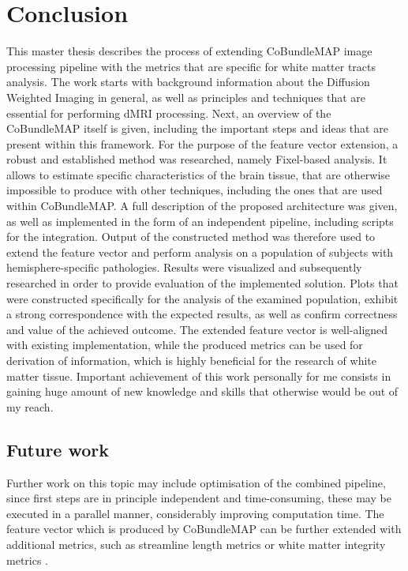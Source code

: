 \documentclass[thesis.tex]{subfiles}
\begin{document}
\chapter{Conclusion}
This master thesis describes the process of extending CoBundleMAP image processing pipeline with the metrics that are specific for white matter tracts analysis. The work starts with background information about the Diffusion Weighted Imaging in general, as well as principles and techniques that are essential for performing dMRI processing. Next, an overview of the CoBundleMAP itself is given, including the important steps and ideas that are present within this framework. For the purpose of the feature vector extension, a robust and established method was researched, namely Fixel-based analysis. It allows to estimate specific characteristics of the brain tissue, that are otherwise impossible to produce with other techniques, including the ones that are used within CoBundleMAP. A full description of the proposed architecture was given, as well as implemented in the form of an independent pipeline, including scripts for the integration. Output of the constructed method was therefore used to extend the feature vector and perform analysis on a population of subjects with hemisphere-specific pathologies. Results were visualized and subsequently researched in order to provide evaluation of the implemented solution. Plots that were constructed specifically for the analysis of the examined population, exhibit a strong correspondence with the expected results, as well as confirm correctness and value of the achieved outcome. The extended feature vector is well-aligned with existing implementation, while the produced metrics can be used for derivation of information, which is highly beneficial for the research of white matter tissue. Important achievement of this work personally for me consists in gaining huge amount of new knowledge and skills that otherwise would be out of my reach.
\section{Future work}
Further work on this topic may include optimisation of the combined pipeline, since first steps are in principle independent and time-consuming, these may be executed in a parallel manner, considerably improving computation time. The feature vector which is produced by CoBundleMAP can be further extended with additional metrics, such as streamline length metrics \cite{extension1} or white matter integrity metrics \cite{extension2}.


\end{document}
